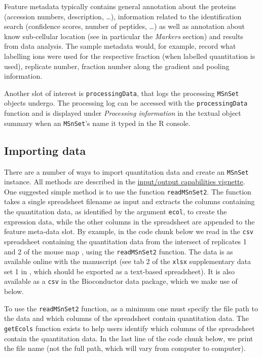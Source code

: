 Feature metadata typically contains general annotation about the
proteins (accession numbers, description, \ldots), information related
to the identification search (confidence scores, number of peptides,
\ldots) as well as annotation about know sub-cellular location (see in
particular the \textit{Markers} section) and results from data
analysis. The sample metadata would, for example, record what
labelling ions were used for the respective fraction (when labelled
quantitation is used), replicate number, fraction number along the
gradient and pooling information.

Another slot of interest is \texttt{processingData}, that logs the
processing \texttt{MSnSet} objects undergo. The processing log can be
accessed with the \texttt{processingData} function and is displayed
under \textit{Processing information} in the textual object summary
when an \texttt{MSnSet}'s name it typed in the R console.

\subsection*{Importing data}

There are a number of ways to import quantitation data and create an
\texttt{MSnSet} instance. All methods are described in the
\href{http://bioconductor.org/packages/release/bioc/vignettes/MSnbase/inst/doc/MSnbase-io.pdf}{input/output
  capabilities vignette}. One suggested simple method is to use the
function \texttt{readMSnSet2}. The function takes a single spreadsheet
filename as input and extracts the columns containing the quantitation
data, as identified by the argument \texttt{ecol}, to create the
expression data, while the other columns in the spreadsheet are
appended to the feature meta-data slot.  By example, in the code chunk
below we read in the \texttt{csv} spreadsheet containing the
quantitation data from the intersect of replicates 1 and 2 of the
mouse map \cite{hyper}, using the \texttt{readMSnSet2} function. The
data is as available online with the manuscript (see tab 2 of the
\texttt{xlsx} supplementary data set 1 in \cite{hyper}, which should
be exported as a text-based spreadsheet). It is also available as a
\texttt{csv} in the Bioconductor  data
package, which we make use of below.

To use the \texttt{readMSnSet2} function, as a minimum one must specify the
file path to the data and which columns of the spreadsheet contain
quantitation data. The \texttt{getEcols} function exists to help users
identify which columns of the spreadsheet contain the
quantitation data. In the last line of the code chunk below, we print
the file name (not the full path, which will vary from computer to
computer). 


